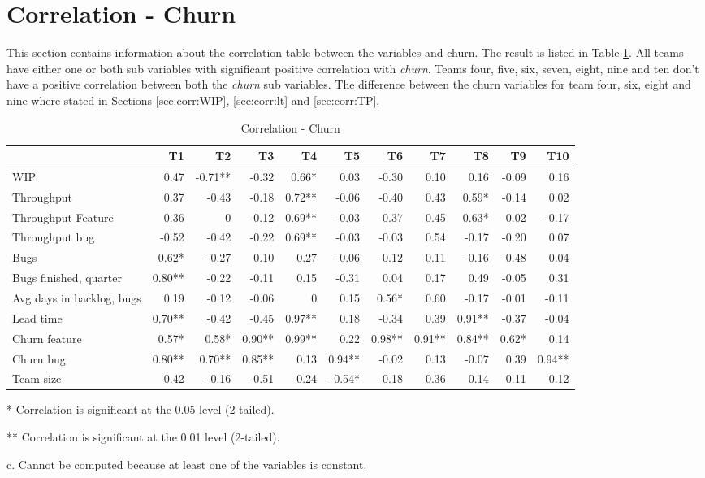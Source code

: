\documentclass[UKenglish]{ifimaster}  %
\begin{document}
\section{Correlation - Churn}
\label{sec:corr:churn}
This section contains information about the correlation table between the variables and churn. The result is listed in Table \ref{corr:churn}.  All teams have either one or both sub variables with significant positive correlation with \textit{churn}. Teams four, five, six, seven, eight, nine and ten don't have a positive correlation between both the \textit{churn} sub variables. The difference between the churn variables for team four, six, eight and nine where stated in Sections \ref{sec:corr:WIP}, \ref{sec:corr:lt} and \ref{sec:corr:TP}.

\begin{table}[!htbp]
 \begin{adjustwidth}{-1.5cm}{}
 \centering
 \begin{tabular}{|l|r|r|r|r|r|r|r|r|r|r|}
\hline
 & \bf{T1} & \bf{T2} & \bf{T3} & \bf{T4} & \bf{T5} & \bf{T6} & \bf{T7} & \bf{T8} & \bf{T9} & \bf{T10}\\ \hline
 WIP  & 0.47 & -0.71** & -0.32 & 0.66* & 0.03 & -0.30 & 0.10 & 0.16 & -0.09 & 0.16 \\ \hline
 Throughput  & 0.37 & -0.43 & -0.18 & 0.72** & -0.06 & -0.40 & 0.43 & 0.59* & -0.14 & 0.02 \\ \hline
 Throughput Feature  & 0.36 & 0 &-0.12 & 0.69** & -0.03 & -0.37 & 0.45 & 0.63* & 0.02 & -0.17 \\ \hline
 Throughput bug  & -0.52 & -0.42 & -0.22 & 0.69** & -0.03 & -0.03 & 0.54 & -0.17 & -0.20 & 0.07 \\ \hline
 Bugs  & 0.62* & -0.27 & 0.10 & 0.27 & -0.06 & -0.12 & 0.11 & -0.16 & -0.48 & 0.04 \\ \hline
 Bugs finished, quarter  & 0.80** & -0.22 & -0.11 & 0.15 & -0.31 & 0.04 & 0.17 & 0.49 & -0.05 & 0.31 \\ \hline
 Avg days in backlog, bugs  & 0.19 & -0.12 & -0.06 & 0 &0.15 & 0.56* & 0.60 & -0.17 & -0.01 & -0.11 \\ \hline
 Lead time  & 0.70** & -0.42 & -0.45 & 0.97** & 0.18 & -0.34 & 0.39 & 0.91** & -0.37 & -0.04 \\ \hline
 Churn feature  & 0.57* & 0.58* & 0.90** & 0.99** & 0.22 & 0.98** & 0.91** & 0.84** & 0.62* & 0.14 \\ \hline
 Churn bug  & 0.80** & 0.70** & 0.85** & 0.13 & 0.94** & -0.02 & 0.13 & -0.07 & 0.39 & 0.94** \\ \hline
 Team size  & 0.42 & -0.16 & -0.51 & -0.24 & -0.54* & -0.18 & 0.36 & 0.14 & 0.11 & 0.12 \\ \hline
\end{tabular}
 \caption{Correlation - Churn}
 \label{corr:churn}
 \centerline {* Correlation is significant at the 0.05 level (2-tailed).}
\centerline{** Correlation is significant at the 0.01 level (2-tailed).}
\centerline{c. Cannot be computed because at least one of the variables is constant.}
\end{adjustwidth}
\end{table}
\end{document}
